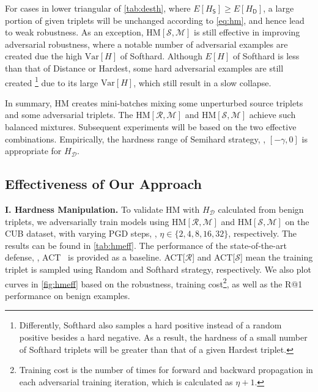 \documentclass[10pt,twocolumn,letterpaper]{article}
\begin{document}
For cases in lower triangular of \cref{tab:desth}, where $E[H_\mathsf{S}]
\geqslant E[H_\mathsf{D}]$, a large portion of given triplets will be unchanged
according to \cref{eq:hm}, and hence lead to weak robustness.
%
As an exception, $\text{HM}[\mathcal{S},\mathcal{M}]$ is still effective in
improving adversarial robustness, where a notable number of adversarial
examples are created due the high $\text{Var}[H]$ of Softhard.
%
Although $E[H]$ of Softhard is less than that of Distance or Hardest, some hard
adversarial examples are still created
%
\footnote{Differently, Softhard also samples a
hard positive instead of a random positive besides a hard negative.
%
As a result, the hardness of a small number of Softhard triplets will be 
greater than that of a given Hardest triplet.}
%
due to its large $\text{Var}[H]$, which
still result in a slow collapse.


In summary, HM creates mini-batches mixing some unperturbed source triplets and
some adversarial triplets.
%
The $\text{HM}[\mathcal{R}, \mathcal{M}]$ and $\text{HM}[\mathcal{S},
\mathcal{M}]$ achieve such balanced mixtures.
%
Subsequent experiments will be based on the two effective combinations.
%
Empirically, the hardness range of Semihard strategy,
\ie, $[-\gamma,0]$ is appropriate for $H_\mathcal{D}$.

\subsection{Effectiveness of Our Approach}
\label{sec:42}



\noindent\textbf{I. Hardness Manipulation.}
%
To validate HM with $H_\mathcal{D}$ calculated from benign
triplets, we adversarially train models using $\text{HM}[\mathcal{R},
\mathcal{M}]$ and $\text{HM}[\mathcal{S}, \mathcal{M}]$ on the CUB dataset,
with varying PGD steps, \ie, $\eta\in\{2,4,8,16,32\}$, respectively.
%
The results can be found in \cref{tab:hmeff}.
%
The performance of the state-of-the-art defense, \ie, ACT~\cite{robrank} is
provided as a baseline.
%
ACT[$\mathcal{R}$] and ACT[$\mathcal{S}$] mean the training triplet is sampled
using Random and Softhard strategy, respectively.
%
We also plot curves in \cref{fig:hmeff} based on the robustness, training
cost\footnote{Training cost is the number of times for forward and backward
propagation in each adversarial training iteration, which is calculated as
$\eta+1$.}, as well as the R@1 performance on benign examples.
\end{document}
